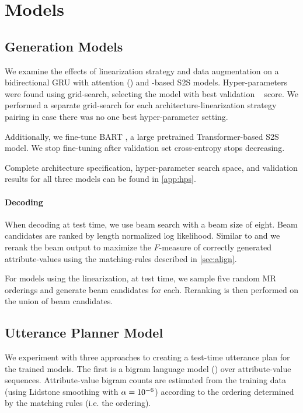 \section{Models}

\subsection{Generation Models}

We examine the effects of linearization strategy and data augmentation on a
bidirectional GRU with attention (\biGRU) and \Transformer-based S2S models.
Hyper-parameters were found using grid-search, selecting the model with best
validation \bleu~\cite{papineni2002} score. We performed a separate
grid-search for each architecture-linearization strategy pairing in case there
was no one best hyper-parameter setting.  

Additionally, we fine-tune BART \cite{lewis2020}, a large pretrained
Transformer-based S2S model. We stop fine-tuning after validation set
cross-entropy stops decreasing.

Complete architecture specification, hyper-parameter search space, and
validation results for all three models can be found in \autoref{app:hps}.

\paragraph{Decoding}

When decoding at test time, we use beam search with a beam size of eight.
Beam candidates are ranked by length normalized log likelihood.  Similar to
\citet{dusek2019} and \citet{juraska2019} we rerank the beam output to
maximize the $F$-measure of correctly generated attribute-values using the
matching-rules described in \autoref{sec:align}.

For models using the   linearization, at test time, we sample
five random MR orderings and generate beam candidates for each. Reranking is
then performed on the union of beam candidates. 

\subsection{Utterance Planner Model} We experiment with three approaches to
creating a test-time utterance plan for the  trained models. The
first is a bigram language model (\BgUP) over attribute-value sequences.
Attribute-value bigram counts are estimated from the training data 
(using Lidstone smoothing \cite{chen1996} with $\alpha=10^{-6}$)  according to the
ordering determined by the matching rules (i.e. the  ordering). 


